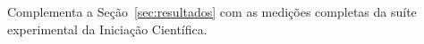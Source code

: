 \label{ap:benchmarks_completos}

Complementa a Seção~\ref{sec:resultados} com as medições completas da suíte experimental da Iniciação Científica.
